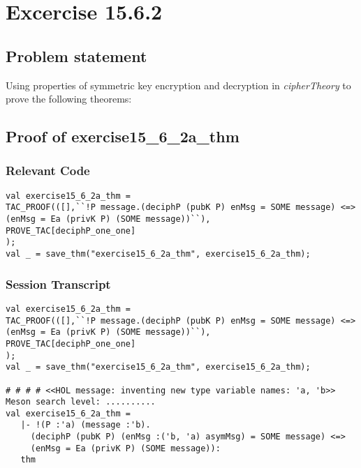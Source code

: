 \documentclass{report}
\begin{document}
\chapter{Excercise 15.6.2}
\label{cha:15.6.2}

\section{Problem statement}
\label{problem-statement-2}
Using properties of symmetric key encryption and decryption in \emph{cipherTheory} to prove the following theorems:
\begin{quote}
\HOLcryptoExercisesTheoremsexerciseOneFiveXXSixXXTwoaXXthm
{}\HOLcryptoExercisesTheoremsexerciseOneFiveXXSixXXTwobXXthm\end{quote}

\section{Proof of exercise15_6_2a_thm}
\label{proof-3}

\subsection{Relevant Code}
\label{rel-code-3}
\begin{lstlisting}[frame=TBlr]
val exercise15_6_2a_thm =
TAC_PROOF(([],``!P message.(deciphP (pubK P) enMsg = SOME message) <=>
(enMsg = Ea (privK P) (SOME message))``),
PROVE_TAC[deciphP_one_one]
);
val _ = save_thm("exercise15_6_2a_thm", exercise15_6_2a_thm);

\end{lstlisting}

\subsection{Session Transcript}
\label{trans3}
\begin{session}
  \begin{scriptsize}
\begin{verbatim}
val exercise15_6_2a_thm =
TAC_PROOF(([],``!P message.(deciphP (pubK P) enMsg = SOME message) <=>
(enMsg = Ea (privK P) (SOME message))``),
PROVE_TAC[deciphP_one_one]
);
val _ = save_thm("exercise15_6_2a_thm", exercise15_6_2a_thm);

# # # # <<HOL message: inventing new type variable names: 'a, 'b>>
Meson search level: ..........
val exercise15_6_2a_thm =
   |- !(P :'a) (message :'b).
     (deciphP (pubK P) (enMsg :('b, 'a) asymMsg) = SOME message) <=>
     (enMsg = Ea (privK P) (SOME message)):
   thm
\end{verbatim}
  \end{scriptsize}
\end{session}
\pagebreak
\end{document}
